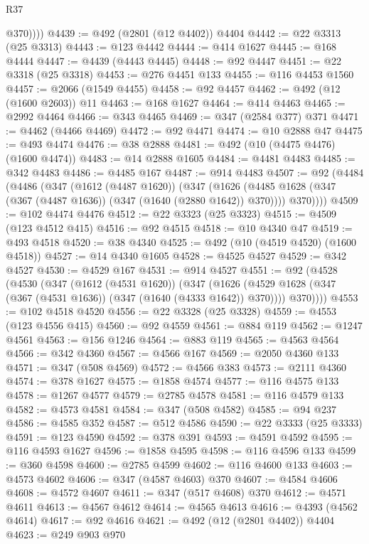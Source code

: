 \begin{lexlean}{R37}
\begin{coremodule}
            @370))))
@4439 := @492 (@2801 (@12 @4402)) @4404
@4442 := @22 @3313 (@25 @3313)
@4443 := @123 @4442
@4444 := @414 @1627
@4445 := @168 @4444
@4447 := @4439 (@4443 @4445)
@4448 := @92 @4447
@4451 := @22 @3318 (@25 @3318)
@4453 := @276 @4451 @133
@4455 := @116 @4453 @1560
@4457 := @2066 (@1549 @4455)
@4458 := @92 @4457
@4462 := @492 (@12 (@1600 @2603)) @11
@4463 := @168 @1627
@4464 := @414 @4463
@4465 := @2992 @4464
@4466 := @343 @4465
@4469 := @347 (@2584 @377) @371
@4471 := @4462 (@4466 @4469)
@4472 := @92 @4471
@4474 := @10 @2888 @47
@4475 := @493 @4474
@4476 := @38 @2888
@4481 := @492 (@10 (@4475 @4476) (@1600 @4474))
@4483 := @14 @2888 @1605
@4484 := @4481 @4483
@4485 := @342 @4483
@4486 := @4485 @167
@4487 := @914 @4483
@4507 := @92
    (@4484
      (@4486
        (@347
          (@1612 (@4487 @1620))
          (@347
            (@1626 (@4485 @1628 (@347 (@367 (@4487 @1636)) (@347 (@1640 (@2880 @1642)) @370))))
            @370))))
@4509 := @102 @4474 @4476
@4512 := @22 @3323 (@25 @3323)
@4515 := @4509 (@123 @4512 @415)
@4516 := @92 @4515
@4518 := @10 @4340 @47
@4519 := @493 @4518
@4520 := @38 @4340
@4525 := @492 (@10 (@4519 @4520) (@1600 @4518))
@4527 := @14 @4340 @1605
@4528 := @4525 @4527
@4529 := @342 @4527
@4530 := @4529 @167
@4531 := @914 @4527
@4551 := @92
    (@4528
      (@4530
        (@347
          (@1612 (@4531 @1620))
          (@347
            (@1626 (@4529 @1628 (@347 (@367 (@4531 @1636)) (@347 (@1640 (@4333 @1642)) @370))))
            @370))))
@4553 := @102 @4518 @4520
@4556 := @22 @3328 (@25 @3328)
@4559 := @4553 (@123 @4556 @415)
@4560 := @92 @4559
@4561 := @884 @119
@4562 := @1247 @4561
@4563 := @156 @1246
@4564 := @883 @119
@4565 := @4563 @4564
@4566 := @342 @4360
@4567 := @4566 @167
@4569 := @2050 @4360 @133
@4571 := @347 (@508 @4569)
@4572 := @4566 @383
@4573 := @2111 @4360
@4574 := @378 @1627
@4575 := @1858 @4574
@4577 := @116 @4575 @133
@4578 := @1267 @4577
@4579 := @2785 @4578
@4581 := @116 @4579 @133
@4582 := @4573 @4581
@4584 := @347 (@508 @4582)
@4585 := @94 @237
@4586 := @4585 @352
@4587 := @512 @4586
@4590 := @22 @3333 (@25 @3333)
@4591 := @123 @4590
@4592 := @378 @391
@4593 := @4591 @4592
@4595 := @116 @4593 @1627
@4596 := @1858 @4595
@4598 := @116 @4596 @133
@4599 := @360 @4598
@4600 := @2785 @4599
@4602 := @116 @4600 @133
@4603 := @4573 @4602
@4606 := @347 (@4587 @4603) @370
@4607 := @4584 @4606
@4608 := @4572 @4607
@4611 := @347 (@517 @4608) @370
@4612 := @4571 @4611
@4613 := @4567 @4612
@4614 := @4565 @4613
@4616 := @4393 (@4562 @4614)
@4617 := @92 @4616
@4621 := @492 (@12 (@2801 @4402)) @4404
@4623 := @249 @903 @970

\end{coremodule}
\end{lexlean}
